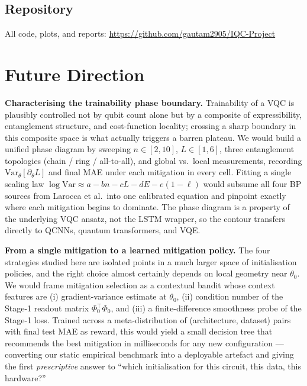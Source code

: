\documentclass[11pt,a4paper]{article}
\begin{document}
\subsection{Repository}

All code, plots, and reports: \url{https://github.com/gautam2905/IQC-Project}

\section{Future Direction}

\textbf{Characterising the trainability phase boundary.} Trainability of a VQC is plausibly controlled not by qubit count alone but by a composite of expressibility, entanglement structure, and cost-function locality; crossing a sharp boundary in this composite space is what actually triggers a barren plateau. We would build a unified phase diagram by sweeping $n \in [2, 10]$, $L \in [1, 6]$, three entanglement topologies (chain / ring / all-to-all), and global vs.\ local measurements, recording $\mathrm{Var}_\theta[\partial_\theta L]$ and final MAE under each mitigation in every cell. Fitting a single scaling law $\log \mathrm{Var} \approx a - b n - c L - d E - e(1-\ell)$ would subsume all four BP sources from Larocca et al.\ into one calibrated equation and pinpoint exactly where each mitigation begins to dominate. The phase diagram is a property of the underlying VQC ansatz, not the LSTM wrapper, so the contour transfers directly to QCNNs, quantum transformers, and VQE.

\textbf{From a single mitigation to a learned mitigation policy.} The four strategies studied here are isolated points in a much larger space of initialisation policies, and the right choice almost certainly depends on local geometry near $\theta_0$. We would frame mitigation selection as a contextual bandit whose context features are (i) gradient-variance estimate at $\theta_0$, (ii) condition number of the Stage-1 readout matrix $\Phi_0^\top \Phi_0$, and (iii) a finite-difference smoothness probe of the Stage-1 loss. Trained across a meta-distribution of (architecture, dataset) pairs with final test MAE as reward, this would yield a small decision tree that recommends the best mitigation in milliseconds for any new configuration --- converting our static empirical benchmark into a deployable artefact and giving the first \emph{prescriptive} answer to ``which initialisation for this circuit, this data, this hardware?''
\end{document}
